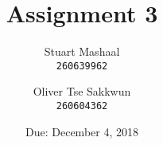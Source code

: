\documentclass[11pt, letterpaper]{article}
\title{Assignment 3}
\author{
    Stuart Mashaal\\
    \texttt{260639962}
    \and
    Oliver Tse Sakkwun\\
    \texttt{260604362}
}
\date{Due: December 4, 2018}
\begin{document}
\begin{titlepage}
    \maketitle
    \thispagestyle{empty}
    \setcounter{page}{0}
\end{titlepage}

%
\end{document}
